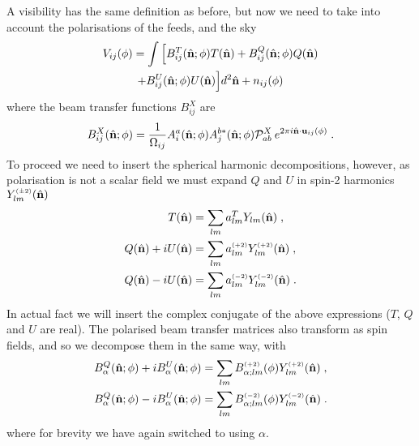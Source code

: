 \documentclass[prd,twocolumn,nofootinbib]{revtex4}
\begin{document}
A visibility has the same definition as before, but now we need to take into
account the polarisations of the feeds, and the sky
\begin{multline}
\label{eq:vispol}
V_{ij}(\phi) = \int \, \Bigl[ B^T_{ij}(\hat{\mathbf{n}}; \phi) T(\hat{\mathbf{n}}) + B^Q_{ij}(\hat{\mathbf{n}}; \phi) Q(\hat{\mathbf{n}})\\
  + B^U_{ij}(\hat{\mathbf{n}}; \phi) U(\hat{\mathbf{n}}) \Bigr] d^2\hat{\mathbf{n}} + n_{ij}(\phi)
\end{multline}
where the beam transfer functions $B^X_{ij}$ are
\begin{equation}
B^X_{ij}(\hat{\mathbf{n}}; \phi) = \frac{1}{\Omega_{ij}}A_i^a(\hat{\mathbf{n}}; \phi) A_j^{b *}(\hat{\mathbf{n}}; \phi)
\mathcal{P}^X_{ab} \:e^{2 \pi i \hat{\mathbf{n}} \cdot
  \mathbf{u}_{ij}(\phi)} \; .
\end{equation}
To proceed we need to insert the spherical harmonic decompositions, however, as
polarisation is not a scalar field we must expand $Q$ and $U$ in spin-2
harmonics $Y_{lm}^{\scriptscriptstyle \left(\pm 2\right)}(\hat{\mathbf{n}})$
\begin{align}
T(\hat{\mathbf{n}}) & = \sum_{lm} a^T_{lm} Y_{lm}(\hat{\mathbf{n}}) \; ,\\
Q(\hat{\mathbf{n}}) + i U(\hat{\mathbf{n}}) & = \sum_{lm} a^{\scriptscriptstyle \left(+2\right)}_{lm}
Y^{\scriptscriptstyle \left(+2\right)}_{lm}(\hat{\mathbf{n}}) \; ,\\
Q(\hat{\mathbf{n}}) - i U(\hat{\mathbf{n}}) & = \sum_{lm} a^{\scriptscriptstyle \left(-2\right)}_{lm}
Y^{\scriptscriptstyle \left(-2\right)}_{lm}(\hat{\mathbf{n}}) \; .
\end{align}
In actual fact we will insert the complex conjugate of the above expressions
($T$, $Q$ and $U$ are real). The polarised beam transfer matrices also transform
as spin fields, and so we decompose them in the same way, with
\begin{align}
B^Q_{\alpha}(\hat{\mathbf{n}}; \phi) + i B^U_{\alpha}(\hat{\mathbf{n}}; \phi) & = \sum_{lm}
B^{\scriptscriptstyle \left(+2\right)}_{\alpha;lm} (\phi)
Y^{\scriptscriptstyle \left(+2\right)}_{lm}(\hat{\mathbf{n}}) \; ,\\
B^Q_{\alpha}(\hat{\mathbf{n}}; \phi) - i B^U_{\alpha}(\hat{\mathbf{n}}; \phi) & = \sum_{lm}
B^{\scriptscriptstyle \left(-2\right)}_{\alpha;lm} (\phi)
Y^{\scriptscriptstyle \left(-2\right)}_{lm}(\hat{\mathbf{n}}) \; .
\end{align}
where for brevity we have again switched to using $\alpha$.
\end{document}
